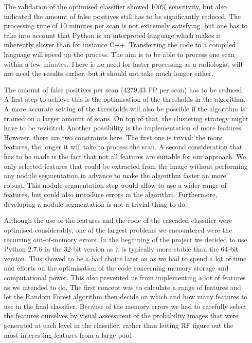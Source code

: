 The validation of the optimised classifier showed 100\% sensitivity, but also
indicated the amount of false positives still has to be significantly reduced.
The processing time of 10 minutes per scan is not extremely satisfying, but one
has to take into account that Python is an interpreted language which makes it
inherently slower than for instance C++. Transferring the code to a compiled
language will speed up the process. The aim is to be able to process one scan
within a few minutes. There is no need for faster processing as a radiologist
will not need the results earlier, but it should not take much longer either.

The amount of false positives per scan (4279,43 FP per scan) has to be reduced.
A first step to achieve this is the optimisation of the thresholds in the
algorithm. A more accurate setting of the thresholds will also be possible if the
algorithm is trained on a larger amount of scans. On top of that, the clustering
strategy might have to be revisited. Another possibility is the implementation
of more features. However, there are two constraints here. The first
one is trivial: the more features, the longer it will take to process the scan.
A second consideration that has to be made is the fact that not all features are
suitable for our approach. We only selected features that could be extracted
from the image without performing any nodule segmentation in advance to make the
algorithm faster an more robust. This nodule segmentation step would allow to
use a wider range of features, but could also introduce errors in the algorithm.
Furthermore, developing a nodule segmentation is not a trivial thing to do.

Although the use of the features and the code of the cascaded classifier were
optimised considerably, one of the largest problems we encountered were the
recurring out-of-memory errors. In the beginning of the project we decided to
use Python 2.7.6 in the 32-bit version as it is typically more stable than the
64-bit version. This showed to be a bad choice later on as we had to spend a lot
of time and efforts on the optimisation of the code concerning memory storage
and computational power. This also prevented us from implementing a lot of
features as we intended to do. The first concept was to calculate a range of
features and let the Random Forest algorithm then decide on which and how many
features to use in the final classifier. Because of the memory errors we had to
carefully select the features ourselves by visual assessment of the probability
images that were generated at each level in the classifier, rather than letting
RF figure out the most interesting features from a large pool.

